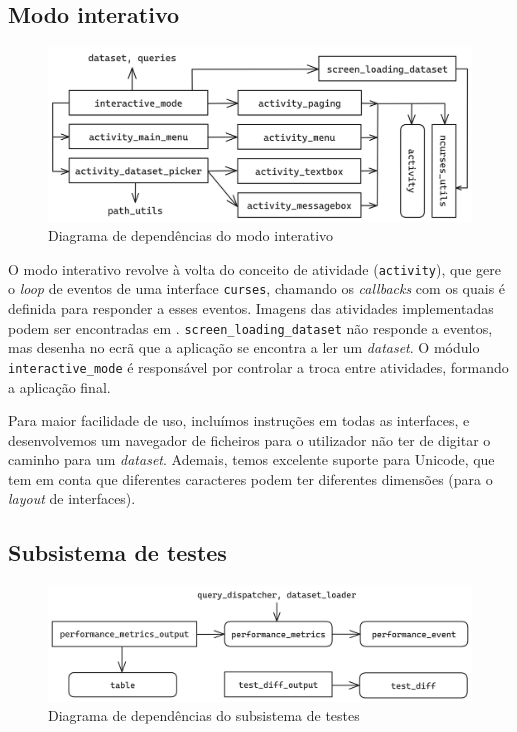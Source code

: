 \documentclass[12pt, a4paper]{article}
\begin{document}
\subsection{Modo interativo}
\label{sec:interactive-mode}

\begin{figure}[ht]
    \centering
    \includegraphics[scale=0.17]{res-fase2/interactive.png}
    \caption{Diagrama de dependências do modo interativo}
    \label{fig:interactive}
\end{figure}

O modo interativo revolve à volta do conceito de atividade (\texttt{activity}), que gere o
\emph{loop} de eventos de uma interface \texttt{curses}, chamando os \emph{callbacks} com os quais
é definida para responder a esses eventos. Imagens das atividades implementadas podem ser
encontradas em . \texttt{screen\_loading\_dataset} não responde
a eventos, mas desenha no ecrã que a aplicação se encontra a ler um \emph{dataset}. O módulo
\texttt{interactive\_mode} é responsável por controlar a troca entre atividades, formando a
aplicação final.

Para maior facilidade de uso, incluímos instruções em todas as interfaces, e desenvolvemos um
navegador de ficheiros para o utilizador não ter de digitar o caminho para um \emph{dataset}.
Ademais, temos excelente suporte para Unicode, que tem em conta que diferentes caracteres podem ter
diferentes dimensões (para o \emph{layout} de interfaces).

\subsection{Subsistema de testes}
\label{sec:testing-subsystem}

\begin{figure}[ht]
    \centering
    \includegraphics[scale=0.15]{res-fase2/testing.png}
    \caption{Diagrama de dependências do subsistema de testes}
    \label{fig:testing}
\end{figure}
\end{document}
